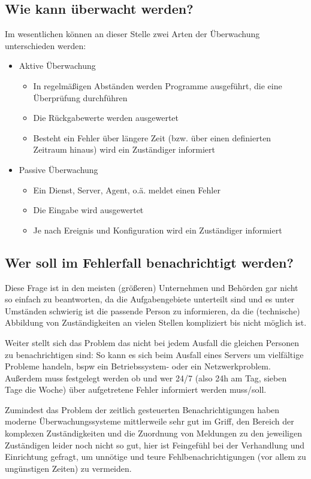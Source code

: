 \documentclass[12pt,a4paper,parskip,listof=totoc,bibliography=totoc]{scrreprt}
\begin{document}
	\subsection{Wie kann überwacht werden?}
	Im wesentlichen können an dieser Stelle zwei Arten der Überwachung unterschieden werden:
	\begin{itemize}
		\item Aktive Überwachung
		\begin{itemize}
		\item In regelmäßigen Abständen werden Programme ausgeführt, die eine Überprüfung durchführen
		\item Die Rückgabewerte werden ausgewertet
		\item Besteht ein Fehler über längere Zeit (bzw. über einen definierten Zeitraum hinaus) wird ein Zuständiger informiert
		\end{itemize}
		\item Passive Überwachung
		\begin{itemize}
			\item Ein Dienst, Server, Agent, o.ä. meldet einen Fehler
			\item Die Eingabe wird ausgewertet
			\item Je nach Ereignis und Konfiguration wird ein Zuständiger informiert
		\end{itemize}
	\end{itemize}
	\subsection{Wer soll im Fehlerfall benachrichtigt werden?}
	Diese Frage ist in den meisten (größeren) Unternehmen und Behörden gar nicht so einfach zu beantworten, da die Aufgabengebiete unterteilt sind und es unter Umständen schwierig ist die passende Person zu informieren, da die (technische) Abbildung von Zuständigkeiten an vielen Stellen kompliziert bis nicht möglich ist. 
	
	Weiter stellt sich das Problem das nicht bei jedem Ausfall die gleichen Personen zu benachrichtigen sind:
	So kann es sich beim Ausfall eines Servers um vielfältige Probleme handeln, \acrlong{bspw} ein Betriebssystem- oder ein Netzwerkproblem.
	Außerdem muss festgelegt werden ob und wer 24/7 (also 24h am Tag, sieben Tage die Woche) über aufgetretene Fehler informiert werden muss/soll.
	
	Zumindest das Problem der zeitlich gesteuerten Benachrichtigungen haben moderne Überwachungssysteme mittlerweile sehr gut im Griff, den Bereich der komplexen Zuständigkeiten und die Zuordnung von Meldungen zu den jeweiligen Zuständigen leider noch nicht so gut, hier ist Feingefühl bei der Verhandlung und Einrichtung gefragt, um unnötige und teure Fehlbenachrichtigungen (vor allem zu ungünstigen Zeiten) zu vermeiden.
\end{document}
